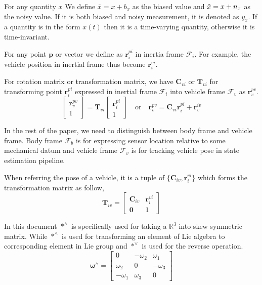 \documentclass[conference]{IEEEtran}
\begin{document}
For any quantity $x$ We define $\bar{x} = x + b_x$ as the biased value and $\Tilde{x} = x + n_x$ as the noisy value. If it is both biased and noisy measurement, it is denoted as $y_x$. If a quantity is in the form $x(t)$ then it is a time-varying quantity, otherwise it is time-invariant.

For any point $\textbf{p}$ or vector we define as $\textbf{r}_i^{pi}$ in inertia frame $\mathcal{F}_i$. For example, the vehicle position in inertial frame thus become $\textbf{r}_i^{vi}$.

For rotation matrix or transformation matrix, we have $\textbf{C}_{vi}$ or $\textbf{T}_{vi}$ for transforming point $\textbf{r}_i^{pi}$ expressed in inertial frame $\bm{\mathcal{F}}_i$ into vehicle frame $\bm{\mathcal{F}}_v$ as $\textbf{r}_v^{pv}$.
$$
\left[\begin{matrix} \textbf{r}_v^{pv} \\ 1 \end{matrix}\right]
    = \textbf{T}_{vi} \left[\begin{matrix} \textbf{r}_i^{pi} \\ 1 \end{matrix}\right]
\quad \text{or} \quad
\textbf{r}_v^{pv} = \textbf{C}_{vi} \textbf{r}_i^{pi} + \textbf{r}_v^{iv}
$$

In the rest of the paper, we need to distinguish between body frame and vehicle frame. Body frame $\bm{\mathcal{F}}_b$ is for expressing sensor location relative to some mechanical datum and vehicle frame $\bm{\mathcal{F}}_v$ is for tracking vehicle pose in state estimation pipeline.

When referring the pose of a vehicle, it is a tuple of $\{\textbf{C}_{iv}, \textbf{r}_i^{vi}\}$ which forms the transformation matrix as follow,
$$
\textbf{T}_{iv} = \left[\begin{matrix}
    \textbf{C}_{iv} & \textbf{r}_i^{vi} \\
    \textbf{0} & 1
\end{matrix}\right]
$$

In this document $*^\wedge$ is specifically used for taking a $\mathbb{R}^3$ into skew symmetric matrix. While $*^\wedge$ is used for transforming an element of Lie algebra to corresponding element in Lie group and $*^\vee$ is used for the reverse operation.
$$
\bm{\omega}^\wedge = \left[\begin{matrix}
    0 & -\omega_2 & \omega_1 \\
    \omega_2 & 0 & -\omega_3 \\
    -\omega_1 & \omega_3 & 0
\end{matrix}\right]
$$
\end{document}
